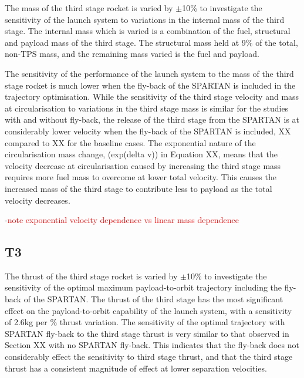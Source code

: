 The mass of the third stage rocket is varied by $\pm$10\% to investigate the sensitivity of the launch system to variations in the internal mass of the third stage. The internal mass which is varied is a combination of the fuel, structural and payload mass of the third stage. The structural mass held at 9\% of the total, non-TPS mass, and the remaining mass varied is the fuel and payload.

The sensitivity of the performance of the launch system to the mass of the third stage rocket is much lower when the fly-back of the SPARTAN is included in the trajectory optimisation. 
While the sensitivity of the third stage velocity and mass at circularisation to variations in the third stage mass is similar for the studies with and without fly-back, the release of the third stage from the SPARTAN is at considerably lower velocity when the fly-back of the SPARTAN is included, XX compared to XX for the baseline cases. 
The exponential nature of the circularisation mass change, (exp(delta v)) in Equation XX, means that the velocity decrease at circularisation caused by increasing the third stage mass requires more fuel mass to overcome at lower total velocity. This causes the increased mass of the third stage to contribute less to payload as the total velocity decreases. 


-\textcolor{red}{note exponential velocity dependence vs linear mass dependence}

\subsection{T3}

The thrust of the third stage rocket is varied by $\pm$10\% to investigate the sensitivity of the optimal maximum payload-to-orbit trajectory including the fly-back of the SPARTAN. 
The thrust of the third stage has the most significant effect on the payload-to-orbit capability of the launch system, with a sensitivity of 2.6kg per \% thrust variation. 
The sensitivity of the optimal trajectory with SPARTAN fly-back to the third stage thrust is very similar to that observed in Section XX with no SPARTAN fly-back. This indicates that the fly-back does not considerably effect the sensitivity to third stage thrust, and that the third stage thrust has a consistent magnitude of effect at lower separation velocities. 


